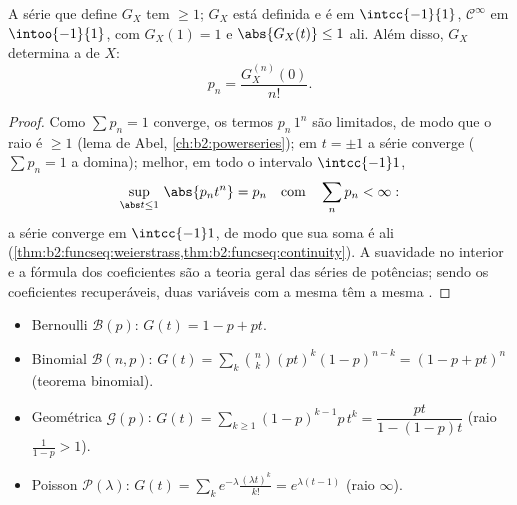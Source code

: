 \begin{proposition}\label{prop:b2:genfun:radius}
A série que define $G_X$ tem  $\geq 1$;
$G_X$ está definida e é  em $\intcc{-1}{1}$,
$\mathcal{C}^\infty$ em $\intoo{-1}{1}$, com $G_X(1) = 1$ e
$\abs{G_X(t)} \leq 1$ ali. Além disso, $G_X$ determina a  de
$X$:
\[
p_n = \frac{G_X^{(n)}(0)}{n!} .
\]
\end{proposition}

\begin{proof}
Como $\sum p_n = 1$ converge, os termos $p_n\,1^n$ são limitados,
de modo que o raio é $\geq 1$ (lema de Abel,
\cref{ch:b2:powerseries}); em $t = \pm1$ a série converge
 ($\sum p_n = 1$ a domina); melhor, em todo o
intervalo $\intcc{-1}1$,
\[
\sup_{\abs t\leq1}\,\abs{p_nt^n} = p_n
\quad\text{com}\quad \sum_np_n < \infty :
\]
a série converge \emph{} em $\intcc{-1}1$, de modo que
sua soma é  ali
(\cref{thm:b2:funcseq:weierstrass,thm:b2:funcseq:continuity}). A suavidade no interior e a fórmula dos
coeficientes são a teoria geral das séries de potências; sendo os coeficientes
recuperáveis, duas variáveis com a mesma 
têm a mesma .
\end{proof}

\begin{example}\label{ex:b2:genfun:classical}
\leavevmode
\begin{itemize}
\item Bernoulli $\mathcal{B}(p)$: $G(t) = 1 - p + pt$.
\item Binomial $\mathcal{B}(n, p)$: $G(t) = \sum_k \binom nk
(pt)^k(1-p)^{n-k} = (1 - p + pt)^n$ (teorema binomial).
\item Geométrica $\mathcal{G}(p)$: $G(t) =
\sum_{k\geq1}(1-p)^{k-1}p\,t^k = \dfrac{pt}{1 - (1-p)t}$ (raio
$\frac{1}{1-p} > 1$).
\item Poisson $\mathcal{P}(\lambda)$: $G(t) =
\sum_k e^{-\lambda}\frac{(\lambda t)^k}{k!} = e^{\lambda(t - 1)}$
(raio $\infty$).
\end{itemize}
\end{example}

